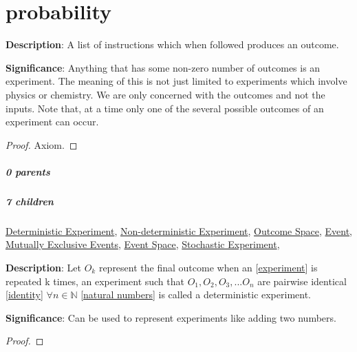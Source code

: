 \documentclass[../main.tex]{subfiles}
\begin{document}
\chapter{probability}


\begin{statement}
\label{statement:Experiment}\hspace*{0pt}\par
\end{statement}
\textbf{Description}:
A list of instructions which when followed produces an outcome.
\par
{\color{magenta} \textbf{Significance}:
Anything that has some non-zero number of outcomes is an experiment.
The meaning of this is not just limited to experiments which involve physics or chemistry.
We are only concerned with the outcomes and not the inputs.
Note that, at a time only one of the several possible outcomes of an experiment can occur.
\par}
\begin{proof}Axiom.\end{proof}\par
\paragraph{0 parents} 
\paragraph{7 children} \hyperref[statement:Deterministic Experiment]{Deterministic Experiment}, \hyperref[statement:Non-deterministic Experiment]{Non-deterministic Experiment}, \hyperref[statement:Outcome Space]{Outcome Space}, \hyperref[statement:Event]{Event}, \hyperref[statement:Mutually Exclusive Events]{Mutually Exclusive Events}, \hyperref[statement:Event Space]{Event Space}, \hyperref[statement:Stochastic Experiment]{Stochastic Experiment}, 





\begin{statement}
\label{statement:Deterministic Experiment}\hspace*{0pt}\par
\end{statement}
\textbf{Description}:
Let $ O_k $ represent the final outcome when an [\hyperref[statement:Experiment]{experiment}] is repeated k times, an experiment such that $ O_1, O_2, O_3, ... O_n $ are pairwise identical [\hyperref[statement:Identity]{identity}] $\forall n \in \mathbb{N} $ [\hyperref[statement:Natural Numbers]{natural numbers}] is called a deterministic experiment.
\par
{\color{magenta} \textbf{Significance}:
Can be used to represent experiments like adding two numbers.
\par}
\begin{proof}
\proofbydefinition
\end{proof}\par
\end{document}

